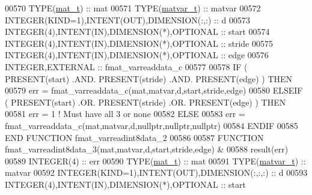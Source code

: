 \begin{DoxyCode}
00570     \textcolor{keywordtype}{TYPE}(\hyperlink{group___m_a_t_gab0fc888f5a5d79943b16284b1f91c2e8}{mat\_t})                                 :: mat
00571     \textcolor{keywordtype}{TYPE}(\hyperlink{group___m_a_t_structmatvar__t}{matvar\_t})                              :: matvar
00572     \textcolor{keywordtype}{INTEGER(KIND=1)},\textcolor{keywordtype}{INTENT(OUT)},\textcolor{keywordtype}{DIMENSION(:,:)}  :: d
00573     \textcolor{keywordtype}{INTEGER(4)},\textcolor{keywordtype}{INTENT(IN)},\textcolor{keywordtype}{DIMENSION(*)},\textcolor{keywordtype}{OPTIONAL} :: start
00574     \textcolor{keywordtype}{INTEGER(4)},\textcolor{keywordtype}{INTENT(IN)},\textcolor{keywordtype}{DIMENSION(*)},\textcolor{keywordtype}{OPTIONAL} :: stride
00575     \textcolor{keywordtype}{INTEGER(4)},\textcolor{keywordtype}{INTENT(IN)},\textcolor{keywordtype}{DIMENSION(*)},\textcolor{keywordtype}{OPTIONAL} :: edge
00576     \textcolor{keywordtype}{INTEGER},\textcolor{keywordtype}{EXTERNAL}                            :: fmat\_varreaddata\_c
00577 
00578     \textcolor{keywordflow}{IF} ( \textcolor{keyword}{PRESENT}(start) .AND. \textcolor{keyword}{PRESENT}(stride) .AND. \textcolor{keyword}{PRESENT}(edge) ) \textcolor{keywordflow}{THEN}
00579         err = fmat\_varreaddata\_c(mat,matvar,d,start,stride,edge)
00580     \textcolor{keywordflow}{ELSEIF} ( \textcolor{keyword}{PRESENT}(start) .OR. \textcolor{keyword}{PRESENT}(stride) .OR. \textcolor{keyword}{PRESENT}(edge) ) \textcolor{keywordflow}{THEN}
00581         err = 1    \textcolor{comment}{! Must have all 3 or none}
00582     \textcolor{keywordflow}{ELSE}
00583         err = fmat\_varreaddata\_c(mat,matvar,d,nullptr,nullptr,nullptr)
00584 \textcolor{keywordflow}{    ENDIF}
00585 \textcolor{keyword}{END FUNCTION }fmat\_varreadint8data\_2
00586 
00587 \textcolor{keyword}{FUNCTION }fmat\_varreadint8data\_3(mat,matvar,d,start,stride,edge) &
00588                                                        result(err)
00589     \textcolor{keywordtype}{INTEGER(4)}                                   :: err
00590     \textcolor{keywordtype}{TYPE}(\hyperlink{group___m_a_t_gab0fc888f5a5d79943b16284b1f91c2e8}{mat\_t})                                  :: mat
00591     \textcolor{keywordtype}{TYPE}(\hyperlink{group___m_a_t_structmatvar__t}{matvar\_t})                               :: matvar
00592     \textcolor{keywordtype}{INTEGER(KIND=1)},\textcolor{keywordtype}{INTENT(OUT)},\textcolor{keywordtype}{DIMENSION(:,:,:)} :: d
00593     \textcolor{keywordtype}{INTEGER(4)},\textcolor{keywordtype}{INTENT(IN)},\textcolor{keywordtype}{DIMENSION(*)},\textcolor{keywordtype}{OPTIONAL}  :: start

\end{DoxyCode}
